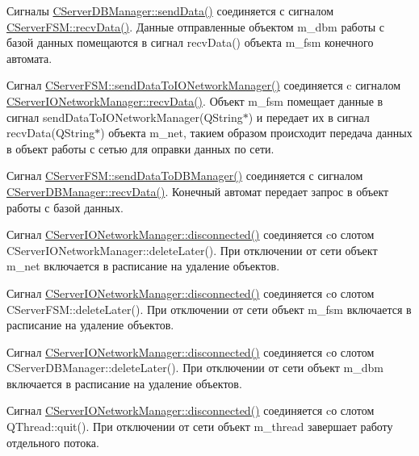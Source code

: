 Сигналы \hyperlink{class_c_abstruct_controller_item_a7cf2bebc87a7d0b660318e946a176eb9}{C\+Server\+D\+B\+Manager\+::send\+Data()} соединяется с сигналом \hyperlink{class_c_abstruct_controller_item_a6898e48061cb0cac2065f8193bd386c1}{C\+Server\+F\+S\+M\+::recv\+Data()}. Данные отправленные объектом m\+\_\+dbm работы с базой данных помещаются в сигнал recv\+Data() объекта m\+\_\+fsm конечного автомата.

Сигнал \hyperlink{class_c_abstruct_f_s_m_a542570a7469e3923eeace7c3c308ff97}{C\+Server\+F\+S\+M\+::send\+Data\+To\+I\+O\+Network\+Manager()} соединяется c сигналом \hyperlink{class_c_abstruct_controller_item_a6898e48061cb0cac2065f8193bd386c1}{C\+Server\+I\+O\+Network\+Manager\+::recv\+Data()}. Объект m\+\_\+fsm помещает данные в сигнал send\+Data\+To\+I\+O\+Network\+Manager(\+Q\+String$\ast$) и передает их в сигнал recv\+Data(\+Q\+String$\ast$) объекта m\+\_\+net, такием образом происходит передача данных в объект работы с сетью для оправки данных по сети.

Сигнал \hyperlink{class_c_abstruct_f_s_m_a8b3e4a9134df07825f357d16e6d7c436}{C\+Server\+F\+S\+M\+::send\+Data\+To\+D\+B\+Manager()} соединяется с сигналом \hyperlink{class_c_abstruct_controller_item_a6898e48061cb0cac2065f8193bd386c1}{C\+Server\+D\+B\+Manager\+::recv\+Data()}. Конечный автомат передает запрос в объект работы с базой данных.

Сигнал \hyperlink{class_c_abstruct_i_o_network_manager_a4c25afd753612c5c719944a3e8ef4373}{C\+Server\+I\+O\+Network\+Manager\+::disconnected()} соединяется cо слотом C\+Server\+I\+O\+Network\+Manager\+::delete\+Later(). При отключении от сети объект m\+\_\+net включается в расписание на удаление объектов.

Сигнал \hyperlink{class_c_abstruct_i_o_network_manager_a4c25afd753612c5c719944a3e8ef4373}{C\+Server\+I\+O\+Network\+Manager\+::disconnected()} соединяется cо слотом C\+Server\+F\+S\+M\+::delete\+Later(). При отключении от сети объект m\+\_\+fsm включается в расписание на удаление объектов.

Сигнал \hyperlink{class_c_abstruct_i_o_network_manager_a4c25afd753612c5c719944a3e8ef4373}{C\+Server\+I\+O\+Network\+Manager\+::disconnected()} соединяется cо слотом C\+Server\+D\+B\+Manager\+::delete\+Later(). При отключении от сети объект m\+\_\+dbm включается в расписание на удаление объектов.

Сигнал \hyperlink{class_c_abstruct_i_o_network_manager_a4c25afd753612c5c719944a3e8ef4373}{C\+Server\+I\+O\+Network\+Manager\+::disconnected()} соединяется cо слотом Q\+Thread\+::quit(). При отключении от сети объект m\+\_\+thread завершает работу отдельного потока.

